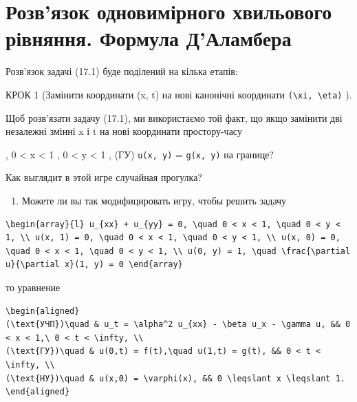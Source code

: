 \documentclass[
  ukrainian,
]{article}
\providecommand{\tightlist}{%
  \setlength{\itemsep}{0pt}\setlength{\parskip}{0pt}}
\begin{document}
\section{Розв'язок одновимірного хвильового рівняння. Формула
Д'Аламбера}\label{ux440ux43eux437ux432ux44fux437ux43eux43a-ux43eux434ux43dux43eux432ux438ux43cux456ux440ux43dux43eux433ux43e-ux445ux432ux438ux43bux44cux43eux432ux43eux433ux43e-ux440ux456ux432ux43dux44fux43dux43dux44f.-ux444ux43eux440ux43cux443ux43bux430-ux434ux430ux43bux430ux43cux431ux435ux440ux430}

Розв'язок задачі (17.1) буде поділений на кілька етапів:

КРОК 1 (Замінити координати (x, t) на нові канонічні координати
\texttt{(\textbackslash{}xi,\ \textbackslash{}eta)} ).

Щоб розв'язати задачу (17.1), ми використаємо той факт, що якщо замінити
дві незалежні змінні x і t на нові координати простору-часу

, 0 \textless{} x \textless{} 1 , 0 \textless{} y \textless{} 1 , (ГУ)
\texttt{u(x,\ y)} = \texttt{g(x,\ y)} на границе?

Как выглядит в этой игре случайная прогулка?

\begin{enumerate}
\def\labelenumi{\arabic{enumi}.}
\setcounter{enumi}{3}
\tightlist
\item
  Можете ли вы так модифицировать игру, чтобы решить задачу
\end{enumerate}

\begin{verbatim}
\begin{array}{l} u_{xx} + u_{yy} = 0, \quad 0 < x < 1, \quad 0 < y < 1, \\ u(x, 1) = 0, \quad 0 < x < 1, \quad 0 < y < 1, \\ u(x, 0) = 0, \quad 0 < x < 1, \quad 0 < y < 1, \\ u(0, y) = 1, \quad \frac{\partial u}{\partial x}(1, y) = 0 \end{array}
\end{verbatim}

то уравнение

\begin{verbatim}
\begin{aligned}
(\text{УЧП})\quad & u_t = \alpha^2 u_{xx} - \beta u_x - \gamma u, && 0 < x < 1,\ 0 < t < \infty, \\
(\text{ГУ})\quad & u(0,t) = f(t),\quad u(1,t) = g(t), && 0 < t < \infty, \\
(\text{НУ})\quad & u(x,0) = \varphi(x), && 0 \leqslant x \leqslant 1.
\end{aligned}
\end{verbatim}
\end{document}
